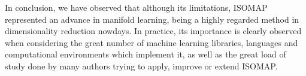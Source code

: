 \documentclass[12pt]{report}
\begin{document}
In conclusion, we have observed that although its limitations, ISOMAP represented an advance in manifold learning, being a highly regarded method in dimensionality reduction nowdays. In practice, its importance is clearly observed when considering the great number of machine learning libraries, languages and computational environments which implement it, as well as the great load of study done by many authors trying to apply, improve or extend ISOMAP.

\newpage



\end{document}
